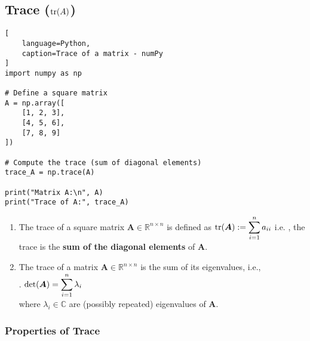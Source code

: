 \subsection{Trace ($\text{tr}(A)$)}


\begin{lstlisting}[
    language=Python,
    caption=Trace of a matrix - numPy
]
import numpy as np

# Define a square matrix
A = np.array([
    [1, 2, 3],
    [4, 5, 6],
    [7, 8, 9]
])

# Compute the trace (sum of diagonal elements)
trace_A = np.trace(A)

print("Matrix A:\n", A)
print("Trace of A:", trace_A)
\end{lstlisting}

\begin{enumerate}
    \item 
    \begin{definition}[Trace]
        The trace of a square matrix $\bm{A} \in \mathbb{R}^{n\times n}$ is defined as $\text{tr}(\bm{A}) := \displaystyle\sum^n _{i=1} a_{ii}$ i.e. , the trace is the \textbf{sum of the diagonal elements} of $\bm{A}$.
        \hfill \cite{mfml/book/mml/Deisenroth-Faisal-Ong}
    \end{definition}

    \item 
    \begin{theorem}
        The trace of a matrix $\bm{A} \in \mathbb{R}^{n\times n}$ is the sum of its eigenvalues, i.e.,
        \hfill \cite{mfml/book/mml/Deisenroth-Faisal-Ong}
        \\
        .\hfill
        $
            \det(\bm{A}) = \displaystyle\sum_{i=1}^{n} \lambda_i
        $
        \hfill \cite{mfml/book/mml/Deisenroth-Faisal-Ong}
        \\
        where $\lambda_i \in \mathbb{C}$ are (possibly repeated) eigenvalues of $\bm{A}$.
        \hfill \cite{mfml/book/mml/Deisenroth-Faisal-Ong}
    \end{theorem}
\end{enumerate}


\subsubsection{Properties of Trace}

